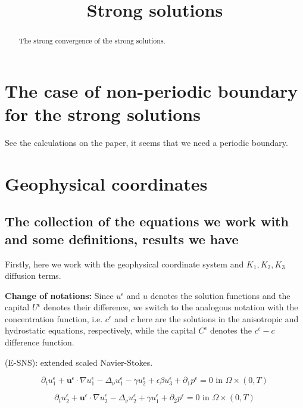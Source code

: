 \documentclass[11pt]{article}
\title{Strong solutions}
\date{}
\begin{document}
\maketitle

\begin{abstract}

The strong convergence of the strong solutions.

\end{abstract}

\newpage
\tableofcontents
\newpage

\section{The case of non-periodic boundary for the strong solutions}

See the calculations on the paper, it seems that we need a periodic boundary.

\section{Geophysical coordinates}

\subsection{The collection of the equations we work with and some definitions, results we have}

Firstly, here we work with the geophysical coordinate system and $K_1, K_2, K_3$ diffusion terms.

\textbf{Change of notations:} Since $u^\epsilon$ and $u$ denotes the solution functions and the capital $U^\epsilon$ denotes their difference, we switch to the analogous notation with the concentration function, i.e. $c^\epsilon$ and $c$ here are the solutions in the anisotropic and hydrostatic equations, respectively, while the capital $C^\epsilon$ denotes the $c^\epsilon - c$ difference function.

(E-SNS): extended scaled Navier-Stokes.

    \begin{equation} \label{ANSC1}
    \partial_t u^\epsilon _1 + \mathbf{u}^\epsilon \cdot \nabla u^\epsilon _1 -\Delta_\nu u^\epsilon _1 -\gamma u_2^\epsilon + \epsilon \beta u_3^\epsilon + \partial_1 p^\epsilon = 0 \text{ in } \Omega \times (0,T)
    \end{equation}
    
    \begin{equation} \label{ANSC2}
    \partial_t u_2^\epsilon + \mathbf{u}^\epsilon \cdot \nabla u_2^\epsilon -\Delta_\nu u_2^\epsilon + \gamma u_1^\epsilon   + \partial_2 p^\epsilon = 0 \text{ in } \Omega \times (0,T)
    \end{equation}
    
\end{document}
